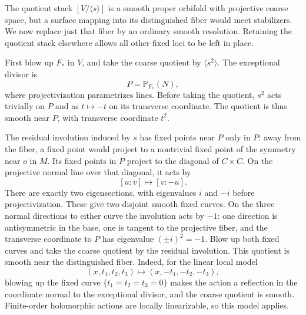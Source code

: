 \documentclass[11pt,reqno]{amsart}
\numberwithin{equation}{section}
\theoremstyle{definition}
\theoremstyle{remark}
\begin{document}
The quotient stack $[V/\langle s\rangle]$ is a smooth proper orbifold
with projective coarse space, but a surface mapping into its distinguished
fiber would
meet stabilizers.  We now replace just that fiber by an ordinary
smooth resolution.  Retaining the quotient stack elsewhere allows
all other fixed loci to be left in place.

First blow up $F_*$ in $V$, and take the coarse quotient by
$\langle s^2\rangle$.  The exceptional divisor is
\begin{equation}\label{geo:P}
                          P=\mathbb P_{F_*}(N),
\end{equation}
where projectivization parametrizes lines.  Before taking the quotient,
$s^2$ acts trivially on $P$ and as $t\mapsto-t$ on its transverse
coordinate.  The quotient is thus smooth near $P$, with transverse
coordinate $t^2$.

The residual involution induced by $s$ has fixed points near $P$ only
in $P$: away from the fiber, a fixed point would project to a
nontrivial fixed point of the symmetry near $o$ in $M$.  Its fixed
points in $P$ project to the diagonal of $C\times C$.  On the
projective normal line over that diagonal, it acts by
\[
                       [u:v]\longmapsto[v:-u].
\]
There are exactly two eigensections, with eigenvalues $i$ and $-i$
before projectivization.  These give two disjoint smooth fixed curves.
On the three normal directions to either curve the involution acts
by $-1$: one direction is antisymmetric in the base, one is tangent
to the projective fiber, and the transverse coordinate to $P$ has
eigenvalue $(\pm i)^2=-1$.  Blow up both fixed curves and take the
coarse quotient by the residual involution.  This quotient is smooth
near the distinguished fiber.  Indeed, for the linear local model
\[
              (x,t_1,t_2,t_3)\longmapsto(x,-t_1,-t_2,-t_3),
\]
blowing up the fixed curve $\{t_1=t_2=t_3=0\}$ makes the action a
reflection in the coordinate normal to the exceptional divisor, and
the coarse quotient is smooth.  Finite-order holomorphic actions are
locally linearizable, so this model applies.
\end{document}
